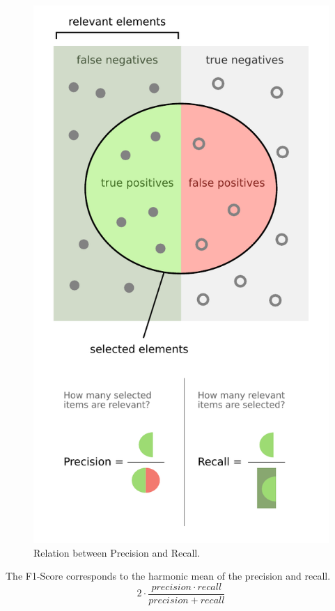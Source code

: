 \begin{figure}[htb]
    \centering
    \includegraphics[height=0.5\textheight]{figures/chap-4/precision-recall.pdf}
    \caption{Relation between Precision and Recall.}
    \label{processing:precision-recall}
\end{figure}

The F1-Score corresponds to the harmonic mean of the precision and recall.
\[2\cdot \frac{precision\cdot recall}{precision + recall}\]

